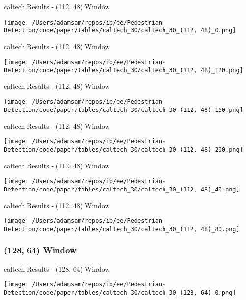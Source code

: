 \begin{table}
    \caption{caltech Results - (112, 48) Window}
    \texttt{[image: /Users/adamsam/repos/ib/ee/Pedestrian-Detection/code/paper/tables/caltech\_30/caltech\_30\_(112, 48)\_0.png]}
    \label{tab:caltech_30_(112, 48)_0}
\end{table}

\begin{table}
    \caption{caltech Results - (112, 48) Window}
    \texttt{[image: /Users/adamsam/repos/ib/ee/Pedestrian-Detection/code/paper/tables/caltech\_30/caltech\_30\_(112, 48)\_120.png]}
    \label{tab:caltech_30_(112, 48)_120}
\end{table}

\begin{table}
    \caption{caltech Results - (112, 48) Window}
    \texttt{[image: /Users/adamsam/repos/ib/ee/Pedestrian-Detection/code/paper/tables/caltech\_30/caltech\_30\_(112, 48)\_160.png]}
    \label{tab:caltech_30_(112, 48)_160}
\end{table}

\begin{table}
    \caption{caltech Results - (112, 48) Window}
    \texttt{[image: /Users/adamsam/repos/ib/ee/Pedestrian-Detection/code/paper/tables/caltech\_30/caltech\_30\_(112, 48)\_200.png]}
    \label{tab:caltech_30_(112, 48)_200}
\end{table}

\begin{table}
    \caption{caltech Results - (112, 48) Window}
    \texttt{[image: /Users/adamsam/repos/ib/ee/Pedestrian-Detection/code/paper/tables/caltech\_30/caltech\_30\_(112, 48)\_40.png]}
    \label{tab:caltech_30_(112, 48)_40}
\end{table}

\begin{table}
    \caption{caltech Results - (112, 48) Window}
    \texttt{[image: /Users/adamsam/repos/ib/ee/Pedestrian-Detection/code/paper/tables/caltech\_30/caltech\_30\_(112, 48)\_80.png]}
    \label{tab:caltech_30_(112, 48)_80}
\end{table}

\subsubsection*{(128, 64) Window}

\begin{table}
    \caption{caltech Results - (128, 64) Window}
    \texttt{[image: /Users/adamsam/repos/ib/ee/Pedestrian-Detection/code/paper/tables/caltech\_30/caltech\_30\_(128, 64)\_0.png]}
    \label{tab:caltech_30_(128, 64)_0}
\end{table}

